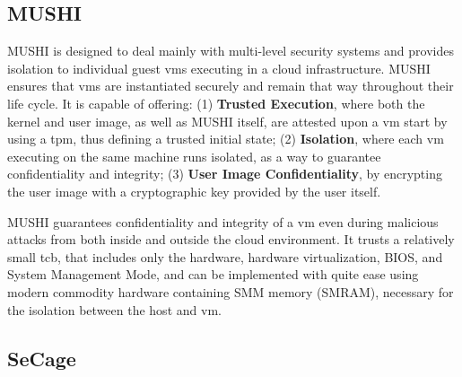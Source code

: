 
\subsection{MUSHI} 

MUSHI \cite{mushiPaper} is designed to deal mainly with multi-level security systems and provides isolation to individual guest \gls{vm}s executing in a cloud infrastructure. MUSHI ensures that \gls{vm}s are instantiated securely and remain that way throughout their life cycle. 
It is capable of offering: (1) \textbf{Trusted Execution}, where both the kernel and user image, as well as MUSHI itself, are attested upon a \gls{vm} start by using a \gls{tpm}, thus defining a trusted initial state; (2) \textbf{Isolation}, where each \gls{vm} executing on the same machine runs isolated, as a way to guarantee confidentiality and integrity; (3) \textbf{User Image Confidentiality}, by encrypting the user image with a cryptographic key provided by the user itself.

MUSHI guarantees confidentiality and integrity of a \gls{vm} even during malicious attacks from both inside and outside the cloud environment.
It trusts a relatively small \gls{tcb}, that includes only the hardware, hardware virtualization, BIOS, and System Management Mode, and can be implemented with quite ease using modern commodity hardware containing SMM memory (SMRAM), necessary for the isolation between the host and \gls{vm}.\newline


\subsection{SeCage} 


